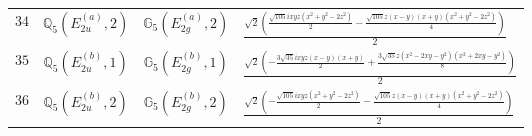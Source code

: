 \documentclass[fleqn,8pt,landscape]{jsarticle}
\begin{document}
\begin{table}[ht!]
\begin{center}
\begin{tabular}{cccl}
$ 34 $ & $ \mathbb{Q}_{5}(E_{2u}^{(a)},2) $ & $ \mathbb{G}_{5}(E_{2g}^{(a)},2) $ & $ \frac{\sqrt{2} \left(\frac{\sqrt{105} i x y z \left(x^{2} + y^{2} - 2 z^{2}\right)}{2} - \frac{\sqrt{105} z \left(x - y\right) \left(x + y\right) \left(x^{2} + y^{2} - 2 z^{2}\right)}{4}\right)}{2} $ \\
$ 35 $ & $ \mathbb{Q}_{5}(E_{2u}^{(b)},1) $ & $ \mathbb{G}_{5}(E_{2g}^{(b)},1) $ & $ \frac{\sqrt{2} \left(- \frac{3 \sqrt{35} i x y z \left(x - y\right) \left(x + y\right)}{2} + \frac{3 \sqrt{35} z \left(x^{2} - 2 x y - y^{2}\right) \left(x^{2} + 2 x y - y^{2}\right)}{8}\right)}{2} $ \\
$ 36 $ & $ \mathbb{Q}_{5}(E_{2u}^{(b)},2) $ & $ \mathbb{G}_{5}(E_{2g}^{(b)},2) $ & $ \frac{\sqrt{2} \left(- \frac{\sqrt{105} i x y z \left(x^{2} + y^{2} - 2 z^{2}\right)}{2} - \frac{\sqrt{105} z \left(x - y\right) \left(x + y\right) \left(x^{2} + y^{2} - 2 z^{2}\right)}{4}\right)}{2} $ \\
 \hline \hline
\end{tabular}
\end{center}
\end{table}
\end{document}

